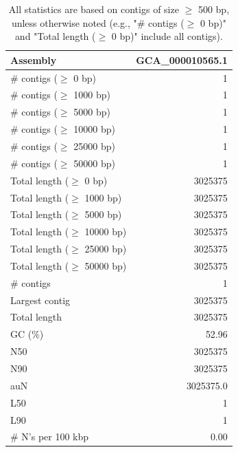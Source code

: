 \documentclass[12pt,a4paper]{article}
\begin{document}
\begin{table}[ht]
\begin{center}
\caption{All statistics are based on contigs of size $\geq$ 500 bp, unless otherwise noted (e.g., "\# contigs ($\geq$ 0 bp)" and "Total length ($\geq$ 0 bp)" include all contigs).}
\begin{tabular}{|l*{1}{|r}|}
\hline
Assembly & GCA\_000010565.1 \\ \hline
\# contigs ($\geq$ 0 bp) & 1 \\ \hline
\# contigs ($\geq$ 1000 bp) & 1 \\ \hline
\# contigs ($\geq$ 5000 bp) & 1 \\ \hline
\# contigs ($\geq$ 10000 bp) & 1 \\ \hline
\# contigs ($\geq$ 25000 bp) & 1 \\ \hline
\# contigs ($\geq$ 50000 bp) & 1 \\ \hline
Total length ($\geq$ 0 bp) & 3025375 \\ \hline
Total length ($\geq$ 1000 bp) & 3025375 \\ \hline
Total length ($\geq$ 5000 bp) & 3025375 \\ \hline
Total length ($\geq$ 10000 bp) & 3025375 \\ \hline
Total length ($\geq$ 25000 bp) & 3025375 \\ \hline
Total length ($\geq$ 50000 bp) & 3025375 \\ \hline
\# contigs & 1 \\ \hline
Largest contig & 3025375 \\ \hline
Total length & 3025375 \\ \hline
GC (\%) & 52.96 \\ \hline
N50 & 3025375 \\ \hline
N90 & 3025375 \\ \hline
auN & 3025375.0 \\ \hline
L50 & 1 \\ \hline
L90 & 1 \\ \hline
\# N's per 100 kbp & 0.00 \\ \hline
\end{tabular}
\end{center}
\end{table}
\end{document}
